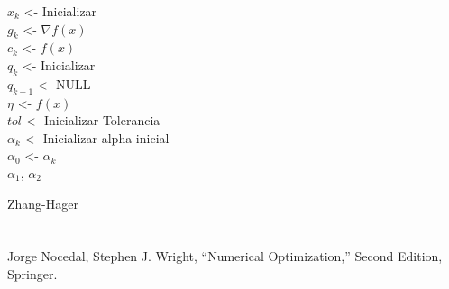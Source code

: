 \documentclass[conference]{IEEEtran}
\begin{document}
\begin{algorithm}[]
    \SetAlgoLined
	$x_k$ <- Inicializar \\
	$g_k$ <- $\nabla f(x)$ \\
	$c_k$ <- $f(x)$ \\
	$q_k$ <- Inicializar \\
	$q_{k-1}$ <- NULL \\
	$\eta$ <- $f(x)$ \\
	$tol$ <- Inicializar Tolerancia \\
	$\alpha_k$ <- Inicializar alpha inicial \\
	$\alpha_0$ <- $\alpha_k$ \\
	$\alpha_1$, $\alpha_2$ \\
     \caption{Zhang-Hager}
\end{algorithm}

\section*{}

\begin{thebibliography}{00}
 Jorge Nocedal, Stephen J. Wright, ``Numerical Optimization,'' Second Edition, Springer.
\end{thebibliography}
\end{document}
